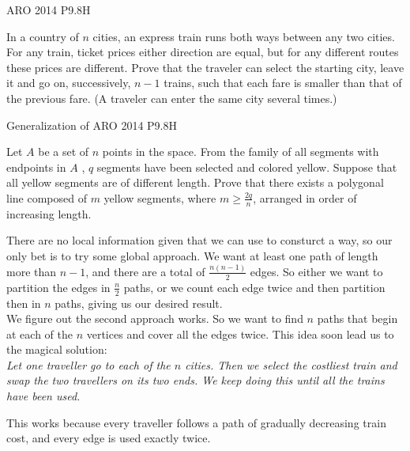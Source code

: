 

{ARO 2014 P9.8}{H}{
    In a country of $n$ cities, an express train runs both ways between any
    two cities. For any train, ticket prices either direction are equal, but
    for any different routes these prices are different. Prove that the
    traveler can select the starting city, leave it and go on, successively,
    $n-1$ trains, such that each fare is smaller than that of the previous
    fare. (A traveler can enter the same city several times.)

}

{Generalization of ARO 2014 P9.8}{H}{
    Let $ A $ be a set of $ n $ points in the space. From the family of all
    segments with endpoints in $ A $ , $ q $ segments have been selected and
    colored yellow. Suppose that all yellow segments are of different length.
    Prove that there exists a polygonal line composed of $ m $ yellow
    segments, where $ m\geq\frac{2q}{n}$, arranged in order of increasing
    length.

}


\begin{solution}
    There are no local information given that we can use to consturct a way,
    so our only bet is to try some global approach. We want at least one path
    of length more than $n-1$, and there are a total of $\frac{n(n-1)}{2}$
    edges. So either we want to partition the edges in $\frac{n}{2}$ paths, or
    we count each edge twice and then partition then in $n$ paths, giving us
    our desired result.\\

    We figure out the second approach works. So we want to find $n$ paths that
    begin at each of the $n$ vertices and cover all the edges twice. This idea
    soon lead us to the magical solution:\\

    \textit{\color{solC}Let one traveller go to each of the $n$ cities. Then we select the
        costliest train and swap the two travellers on its two ends. We keep doing
    this until all the trains have been used.\\}

    This works because every traveller follows a path of gradually decreasing
    train cost, and every edge is used exactly twice.
\end{solution} 

